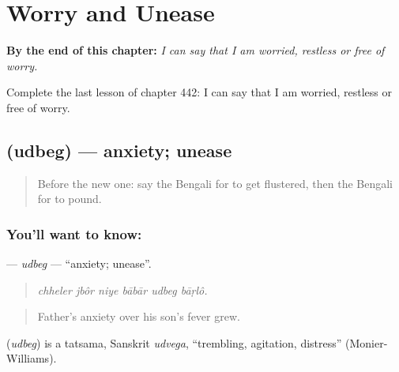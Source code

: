 
\chapter{Worry and Unease}
\label{ch:bn-worry-and-unease}

\begin{chapteropening}
\textbf{By the end of this chapter:} \emph{I can say that I am worried, restless or free of worry.}

Complete the last lesson of chapter 442: I can say that I am worried, restless or free of worry.
\end{chapteropening}

\section[\texorpdfstring{\bn{উদ্বেগ} (udbeg)}{উদ্বেগ (udbeg)}]{ (udbeg) — anxiety; unease}

\label{lesson:BN-C442-udbeg}



\begin{quote}
Before the new one: say the Bengali for to get flustered, then the Bengali for to pound.
\end{quote}

\subsection*{You'll want to know: }
\textbf{} — \emph{udbeg} — \textquotedblleft{}anxiety; unease\textquotedblright{}.

\begin{quote}
     
\end{quote}

\begin{quote}
\emph{chheler jbôr niye bābār udbeg bāṛlô.}
\end{quote}

\begin{quote}
Father's anxiety over his son's fever grew.
\end{quote}

\begin{cousinweb}
\textbf{} (\emph{udbeg}) is a tatsama, Sanskrit \emph{udvega}, \textquotedblleft{}trembling, agitation, distress\textquotedblright{} (Monier-Williams).
\end{cousinweb}

